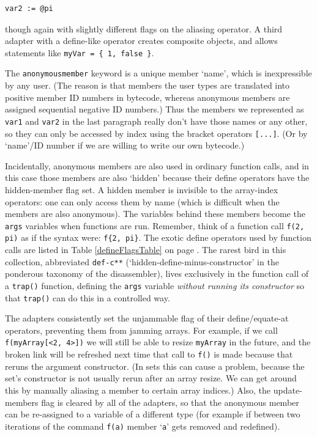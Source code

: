 \documentclass{article}
\newenvironment{code}{
       \begin{list}{}{
               \setlength{\leftmargin}{.4in}
               \setlength{\rightmargin}{0in}
               \setlength{\topsep}{.2in}
       }
       \small
       \item[] }
       { \end{list}   }
\begin{document}
\begin{code} \begin{verbatim}
var2 := @pi
\end{verbatim} \end{code}

\noindent though again with slightly different flags on the aliasing operator.  A third adapter with a define-like operator creates composite objects, and allows statements like \verb#myVar = { 1, false }#.

The \verb#anonymousmember# keyword is a unique member `name', which is inexpressible by any user.  (The reason is that members the user types are translated into positive member ID numbers in bytecode, whereas anonymous members are assigned sequential negative ID numbers.)  Thus the members we represented as \verb#var1# and \verb#var2# in the last paragraph really don't have those names or any other, so they can only be accessed by index using the bracket operators \verb#[...]#.  (Or by `name'/ID number if we are willing to write our own bytecode.)

Incidentally, anonymous members are also used in ordinary function calls, and in this case those members are also `hidden' because their define operators have the hidden-member flag set.  A hidden member is invisible to the array-index operators:  one can only access them by name (which is difficult when the members are also anonymous).  The variables behind these members become the \verb#args# variables when functions are run.  Remember, think of a function call \verb#f(2, pi)# as if the syntax were:  \verb#f{2, pi}#.  The exotic define operators used by function calls are listed in Table \ref{defineFlagsTable} on page \pageref{defineFlagsTable}.  The rarest bird in this collection, abbreviated \verb#def-c**# (`hidden-define-minus-constructor' in the ponderous taxonomy of the disassembler), lives exclusively in the function call of a \verb#trap()# function, defining the \verb#args# variable \emph{without running its constructor} so that \verb#trap()# can do this in a controlled way.

The adapters consistently set the unjammable flag of their define/equate-at operators, preventing them from jamming arrays.  For example, if we call \verb#f(myArray[<2, 4>])# we will still be able to resize \verb#myArray# in the future, and the broken link will be refreshed next time that call to \verb#f()# is made because that reruns the argument constructor.  (In sets this can cause a problem, because the set's constructor is not usually rerun after an array resize.  We can get around this by manually aliasing a member to certain array indices.)  Also, the update-members flag is cleared by all of the adapters, so that the anonymous member can be re-assigned to a variable of a different type (for example if between two iterations of the command \verb#f(a)# member `\verb#a#' gets removed and redefined).
\end{document}

